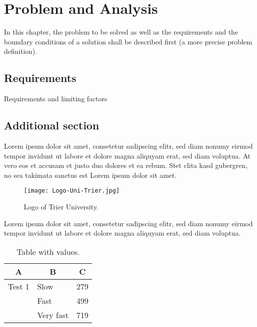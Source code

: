 
\chapter{Problem and Analysis}
\label{ch:analysis}
In this chapter, the problem to be solved as well as the requirements and the boundary conditions of a solution shall be described first (a more precise problem definition).


\section{Requirements}
\label{ch:analysis:sec:requirements}
Requirements and limiting factors

\section{Additional section}
\label{ch:analysis:sec:section}

Lorem ipsum dolor sit amet, consetetur sadipscing elitr, sed diam nonumy eirmod tempor invidunt ut labore et dolore magna aliquyam erat, sed diam voluptua. At vero eos et accusam et justo duo dolores et ea rebum. Stet clita kasd gubergren, no sea takimata sanctus est Lorem ipsum dolor sit amet.

\begin{figure}[htb]
\centering
  	{\texttt{[image: Logo-Uni-Trier.jpg]}}
	\caption{Logo of Trier University.\label{fig:grafik1}}
\centering
\end{figure}

Lorem ipsum dolor sit amet, consetetur sadipscing elitr, sed diam nonumy eirmod tempor invidunt ut labore et dolore magna aliquyam erat, sed diam voluptua. 

\begin{table}[htb]
\caption{Table with values.\label{tab:list}}
\vspace*{1em}
\centering

\bgroup
\def\arraystretch{1.3}%

\begin{tabular}[c]{l|l|c}
	
	\multicolumn{1}{c|}{\textbf{A}} & 
	\multicolumn{1}{c|}{\textbf{B}} & 
	\multicolumn{1}{c}{\textbf{C}} \\ 
	
	\hline

	Test 1& Slow& 279 \\ 
	&Fast & 499 \\ 
	&Very fast& 719 \\ 
	
\end{tabular}

\egroup

\end{table}

